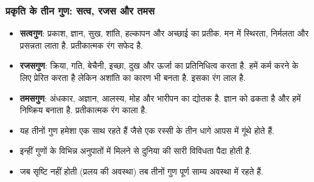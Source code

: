 \begin{frame}[fragile]\frametitle{प्रकृति के तीन गुण: सत्व, रजस और तमस}
      \begin{itemize}
	\item \textbf{सत्वगुण}: प्रकाश, ज्ञान, सुख, शांति, हल्कापन और अच्छाई का प्रतीक. मन में स्थिरता, निर्मलता और प्रसन्नता लाता है. प्रतीकात्मक रंग सफेद है.
	\item \textbf{रजसगुण}: क्रिया, गति, बेचैनी, इच्छा, दुख और ऊर्जा का प्रतिनिधित्व करता है. हमें कर्म करने के लिए प्रेरित करता है लेकिन अशांति का कारण भी बनता है. इसका रंग लाल है.
	\item \textbf{तमसगुण}: अंधकार, अज्ञान, आलस्य, मोह और भारीपन का द्योतक है. ज्ञान को ढकता है और हमें निष्क्रिय बनाता है. प्रतीकात्मक रंग काला है.
    \item यह तीनों गुण हमेशा एक साथ रहते हैं जैसे एक रस्सी के तीन धागे आपस में गूंथे होते हैं.
	\item इन्हीं गुणों के विभिन्न अनुपातों में मिलने से दुनिया की सारी विविधता पैदा होती है.
    \item जब सृष्टि नहीं होती (प्रलय की अवस्था) तब तीनों गुण पूर्ण साम्य अवस्था में रहते हैं.
	  \end{itemize}
\end{frame}

